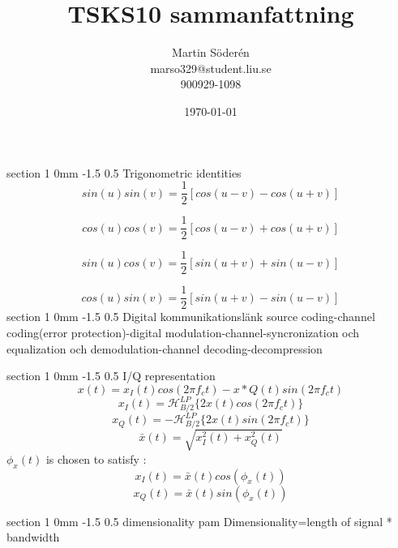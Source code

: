 \documentclass[a4paper,11pt]{article}
\makeatletter
\renewcommand{\section}{\@startsection
   {section}%
   {1}%
   {0mm}%
   {-1.5\baselineskip}%
   {0.5\baselineskip}%
   {\sffamily\bfseries\upshape\normalsize}}%
\makeatother
\begin{document}
\begin{titlepage}
\title{TSKS10 sammanfattning}
\author{Martin Söderén\\ marso329@student.liu.se\\900929-1098}
\date{\today}
\maketitle




\vfill %

\thispagestyle{empty}

\end{titlepage}

\newpage
\tableofcontents	%

\newpage

\section{Trigonometric identities}
$$sin(u)sin(v)=\frac{1}{2} [cos(u-v)-cos(u+v)]$$

$$cos(u)cos(v)=\frac{1}{2} [cos(u-v)+cos(u+v)]$$

$$sin(u)cos(v)=\frac{1}{2} [sin(u+v)+sin(u-v)]$$

$$cos(u)sin(v)=\frac{1}{2} [sin(u+v)-sin(u-v)]$$
\section{Digital kommunikationslänk}
source coding-channel coding(error protection)-digital modulation-channel-syncronization och equalization och demodulation-channel decoding-decompression

\section{I/Q representation}
$$ x(t)=x_I(t)cos(2\pi f_ct)-x*Q(t)sin(2\pi f_c t)$$
$$x_I(t)=\mathcal{H}_{B/2}^{LP} \{ 2x(t)cos(2\pi f_c t)\}$$
$$x_Q(t)=-\mathcal{H}_{B/2}^{LP} \{ 2x(t)sin(2\pi f_c t)\}$$
$$\bar{x}(t)=\sqrt{x_I^2(t)+x_Q^2(t)}$$
$\phi_x(t)$ is chosen to satisfy :
$$x_I(t)=\bar{x}(t)cos(\phi_x(t)) $$
$$x_Q(t)=\bar{x}(t)sin(\phi_x(t)) $$

\section{dimensionality pam}
Dimensionality=length of signal * bandwidth
\end{document}
